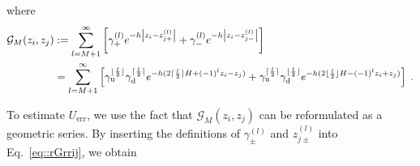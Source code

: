 where 
\begin{equation}\label{eq::rGrrij}
 \begin{split}
        \mathcal{G}_{M}(z_i,z_j)&:=\sum\limits_{l=M+1}^{\infty}\left[\gamma_+^{(l)}e^{-h\left|z_i-z_{j+}^{(l)}\right|}+\gamma_-^{(l)}e^{-h\left|z_i-z_{j-}^{(l)}\right|}\right]\; \\
        &= \sum\limits_{l = M + 1}^{\infty} \left[ \gamma_{\text{u}}^{\lfloor \frac{l}{2} \rfloor}\gamma_{\text{d}}^{\lceil \frac{l}{2} \rceil} e^{-h (2 \lceil \frac{l}{2} \rceil H + (-1)^l z_i - z_j)} + \gamma_{\text{u}}^{\lceil \frac{l}{2} \rceil}\gamma_{\text{d}}^{\lfloor \frac{l}{2} \rfloor} e^{-h (2 \lfloor \frac{l}{2} \rfloor H - (-1)^l z_i + z_j)} \right]\;.
    \end{split}
\end{equation}

To estimate $U_{\text{err}}$, we use the fact that $\mathcal{G}_{M}(z_i,z_j)$ can be reformulated as a geometric series. By inserting the definitions of $\gamma_{\pm}^{(l)}$ and $z_{j \pm}^{(l)}$ into Eq.~\eqref{eq::rGrrij}, we obtain 

